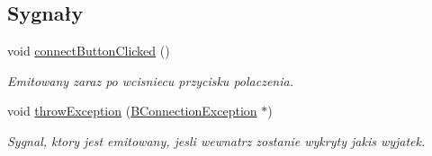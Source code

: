 \subsection*{Sygnały}
\begin{DoxyCompactItemize}
\item 
void \hyperlink{class_b_connection_widget_a2eef5117ae0e5b76ca02a86d00fbd70a}{connectButtonClicked} ()
\begin{DoxyCompactList}\small\item\em Emitowany zaraz po wcisniecu przycisku polaczenia. \item\end{DoxyCompactList}\item 
void \hyperlink{class_b_connection_widget_a8d14da5ae492c481f88adfbcdabf47d2}{throwException} (\hyperlink{class_b_connection_exception}{BConnectionException} $\ast$)
\begin{DoxyCompactList}\small\item\em Sygnal, ktory jest emitowany, jesli wewnatrz zostanie wykryty jakis wyjatek. \item\end{DoxyCompactList}\end{DoxyCompactItemize}
